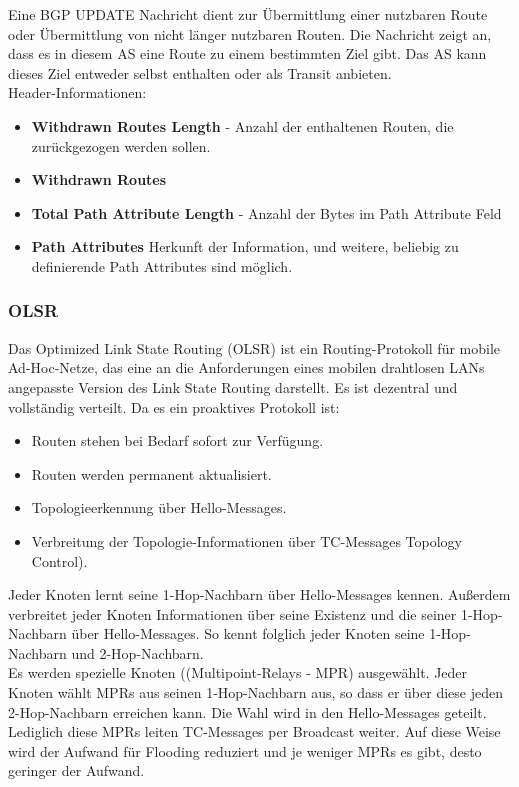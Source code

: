 \documentclass{article} %
\begin{document}
\noindent Eine BGP UPDATE Nachricht dient zur Übermittlung einer nutzbaren Route oder Übermittlung von nicht länger nutzbaren Routen. Die Nachricht zeigt an, dass es in diesem AS eine Route zu einem bestimmten Ziel gibt. Das AS kann dieses Ziel entweder selbst enthalten oder als Transit anbieten.\\
Header-Informationen:
	\begin{itemize}
	\item \textbf{Withdrawn Routes Length}  - Anzahl der enthaltenen Routen, die zurückgezogen werden sollen. 
	\item \textbf{Withdrawn Routes} 
	\item \textbf{Total Path Attribute Length} - Anzahl der Bytes im Path Attribute Feld
	\item \textbf{Path Attributes} Herkunft der Information, und weitere, beliebig zu definierende Path Attributes sind möglich. 
	\end{itemize}
\subsubsection{OLSR}
Das Optimized Link State Routing (OLSR) ist ein Routing-Protokoll für mobile Ad-Hoc-Netze, das eine an die Anforderungen eines mobilen drahtlosen LANs angepasste Version des Link State Routing darstellt. Es ist dezentral und vollständig verteilt. Da es ein proaktives Protokoll ist:
	\begin{itemize}
	\item Routen stehen bei Bedarf sofort zur Verfügung. 
	\item Routen werden permanent aktualisiert. 
	\item Topologieerkennung über Hello-Messages. 
	\item Verbreitung der Topologie-Informationen über TC-Messages Topology Control). 
	\end{itemize}
Jeder Knoten lernt seine 1-Hop-Nachbarn über Hello-Messages kennen. Außerdem verbreitet jeder Knoten  Informationen über seine Existenz und die seiner 1-Hop-Nachbarn über Hello-Messages. So kennt folglich jeder Knoten seine 1-Hop-Nachbarn und 2-Hop-Nachbarn. \\
Es werden spezielle Knoten ((Multipoint-Relays - MPR) ausgewählt. Jeder Knoten wählt MPRs aus seinen 1-Hop-Nachbarn aus, so dass er über diese jeden 2-Hop-Nachbarn erreichen kann. Die Wahl wird in den Hello-Messages geteilt. Lediglich diese MPRs leiten TC-Messages per Broadcast weiter. Auf diese Weise wird der Aufwand für Flooding reduziert und je weniger MPRs es gibt, desto geringer der Aufwand.\\
\end{document}

